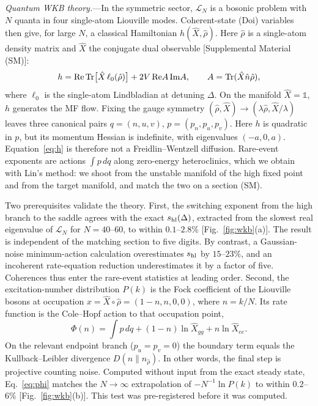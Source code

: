 \documentclass[aps,prl,twocolumn,superscriptaddress,amsmath,amssymb,reprint]{revtex4-2}
\newcommand{\Lc}{\mathcal{L}}
\begin{document}
\emph{Quantum WKB theory.}---In the symmetric sector, $\Lc_N$ is a bosonic problem with $N$ quanta in four single-atom Liouville modes. Coherent-state (Doi) variables then give, for large $N$, a classical Hamiltonian $h(\hat X,\hat\rho)$. Here $\hat\rho$ is a single-atom density matrix and $\hat X$ the conjugate dual observable [Supplemental Material (SM)]:
\begin{equation}
h={\rm Re}\,{\rm Tr}\big[\hat X\,\ell_0(\hat\rho)\big]+2V\,{\rm Re}A\,{\rm Im}A,\qquad A={\rm Tr}(\hat X\hat n\hat\rho),
\label{eq:h}
\end{equation}
where $\ell_0$ is the single-atom Lindbladian at detuning $\Delta$. On the manifold $\hat X=\mathbb 1$, $h$ generates the MF flow. Fixing the gauge symmetry $(\hat\rho,\hat X)\to(\lambda\hat\rho,\hat X/\lambda)$ leaves three canonical pairs $q=(n,u,v)$, $p=(p_n,p_u,p_v)$. Here $h$ is quadratic in $p$, but its momentum Hessian is indefinite, with eigenvalues $(-a,0,a)$. Equation~\eqref{eq:h} is therefore not a Freidlin–Wentzell diffusion. Rare-event exponents are actions $\int p\,dq$ along zero-energy heteroclinics, which we obtain with Lin's method: we shoot from the unstable manifold of the high fixed point and from the target manifold, and match the two on a section (SM).

Two prerequisites validate the theory. First, the switching exponent from the high branch to the saddle agrees with the exact $s_{\rm hl}(\Delta)$, extracted from the slowest real eigenvalue of $\Lc_N$ for $N=40$--$60$, to within $0.1$--$2.8\%$ [Fig.~\ref{fig:wkb}(a)]. The result is independent of the matching section to five digits. By contrast, a Gaussian-noise minimum-action calculation overestimates $s_{\rm hl}$ by $15$--$23\%$, and an incoherent rate-equation reduction underestimates it by a factor of five. Coherences thus enter the rare-event statistics at leading order. Second, the excitation-number distribution $P(k)$ is the Fock coefficient of the Liouville bosons at occupation $x=\hat X\!\circ\!\hat\rho=(1-n,n,0,0)$, where $n=k/N$. Its rate function is the Cole–Hopf action to that occupation point,
\begin{equation}
\Phi(n)=\int p\,dq+(1-n)\ln\hat X_{gg}+n\ln\hat X_{ee}.
\label{eq:phi}
\end{equation}
On the relevant endpoint branch ($p_u=p_v=0$) the boundary term equals the Kullback–Leibler divergence $D(n\|n_{\hat\rho})$. In other words, the final step is projective counting noise. Computed without input from the exact steady state, Eq.~\eqref{eq:phi} matches the $N\to\infty$ extrapolation of $-N^{-1}\ln P(k)$ to within $0.2$--$6\%$ [Fig.~\ref{fig:wkb}(b)]. This test was pre-registered before it was computed.
\end{document}
